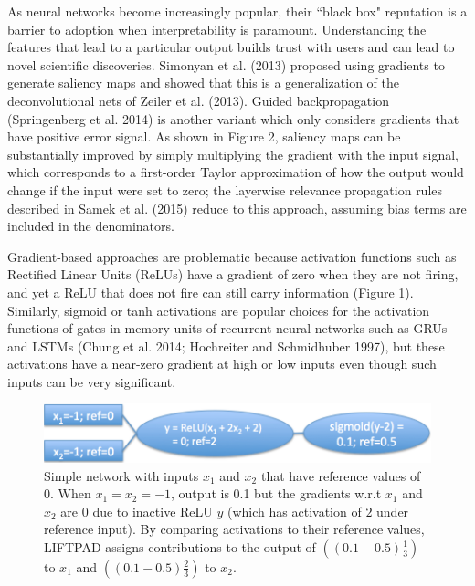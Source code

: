 \documentclass{article}
\begin{document}
As neural networks become increasingly popular, their ``black box" reputation is a barrier to adoption when interpretability is paramount. Understanding the features that lead to a particular output builds trust with users and can lead to novel scientific discoveries. Simonyan et al. (2013) proposed using gradients to generate saliency maps and showed that this is a generalization of the deconvolutional nets of Zeiler et al. (2013). Guided backpropagation (Springenberg et al. 2014) is another variant which only considers gradients that have positive error signal. As shown in Figure 2, saliency maps can be substantially improved by simply multiplying the gradient with the input signal, which corresponds to a first-order Taylor approximation of how the output would change if the input were set to zero; the layerwise relevance propagation rules described in Samek et al. (2015) reduce to this approach, assuming bias terms are included in the denominators.

Gradient-based approaches are problematic because activation functions such as Rectified Linear Units (ReLUs) have a gradient of zero when they are not firing, and yet a ReLU that does not fire can still carry information (Figure 1). Similarly, sigmoid or tanh activations are popular choices for the activation functions of gates in memory units of recurrent neural networks such as GRUs and LSTMs (Chung et al. 2014; Hochreiter and Schmidhuber 1997), but these activations have a near-zero gradient at high or low inputs even though such inputs can be very significant.

\begin{figure}[!ht]
\vspace{-5px}
\begin{center}
\includegraphics[scale=0.5]{SimpleExample.png}
\caption{Simple network with inputs $x_1$ and $x_2$ that have reference values of 0. When $x_1 = x_2 = -1$, output is 0.1 but the gradients w.r.t $x_1$ and $x_2$ are 0 due to inactive ReLU $y$ (which has activation of $2$ under reference input). By comparing activations to their reference values, LIFTPAD assigns contributions to the output of $\left((0.1-0.5)\frac{1}{3}\right)$ to $x_1$ and $\left((0.1-0.5)\frac{2}{3}\right)$ to $x_2$.}
\end{center}
\vspace{-10px}
\end{figure}
\end{document}
